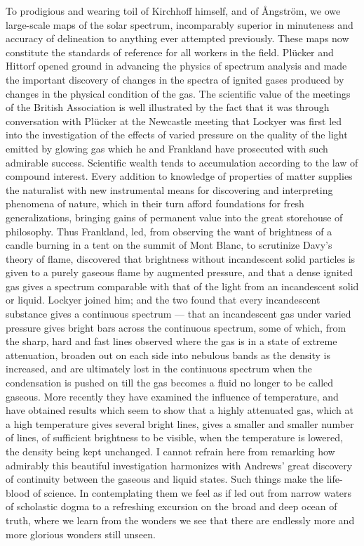 \documentclass[a4paper, 11pt, oneside, english]{article}
\begin{document}
To prodigious and wearing toil of Kirchhoff himself, and of Ångström, we owe large-scale maps of the solar spectrum, incomparably superior in minuteness and accuracy of delineation to anything ever attempted previously. These maps now constitute the standards of reference for all workers in the field. Plücker and Hittorf opened ground in advancing the physics of spectrum analysis and made the important discovery of changes in the spectra of ignited gases produced by changes in the physical condition of the gas. The scientific value of the meetings of the British Association is well illustrated by the fact that it was through conversation with Plücker at the Newcastle meeting that Lockyer was first led into the investigation of the effects of varied pressure on the quality of the light emitted by glowing gas which he and Frankland have prosecuted with such admirable success. Scientific wealth tends to accumulation according to the law of compound interest. Every addition to knowledge of properties of matter supplies the naturalist with new instrumental means for discovering and interpreting phenomena of nature, which in their turn afford foundations for fresh generalizations, bringing gains of permanent value into the great storehouse of philosophy. Thus Frankland, led, from observing the want of brightness of a candle burning in a tent on the summit of Mont Blanc, to scrutinize Davy's theory of flame, discovered that brightness without incandescent solid particles is given to a purely gaseous flame by augmented pressure, and that a dense ignited gas gives a spectrum comparable with that of the light from an incandescent solid or liquid. Lockyer joined him; and the two found that every incandescent substance gives a continuous spectrum --- that an incandescent gas under varied pressure gives bright bars across the continuous spectrum, some of which, from the sharp, hard and fast lines observed where the gas is in a state of extreme attenuation, broaden out on each side into nebulous bands as the density is increased, and are ultimately lost in the continuous spectrum when the condensation is pushed on till the gas becomes a fluid no longer to be called gaseous. More recently they have examined the influence of temperature, and have obtained results which seem to show that a highly attenuated gas, which at a high temperature gives several bright lines, gives a smaller and smaller number of lines, of sufficient brightness to be visible, when the temperature is lowered, the density being kept unchanged. I cannot refrain here from remarking how admirably this beautiful investigation harmonizes with Andrews' great discovery of continuity between the gaseous and liquid states. Such things make the life-blood of science. In contemplating them we feel as if led out from narrow waters of scholastic dogma to a refreshing excursion on the broad and deep ocean of truth, where we learn from the wonders we see that there are endlessly more and more glorious wonders still unseen.
\end{document}
